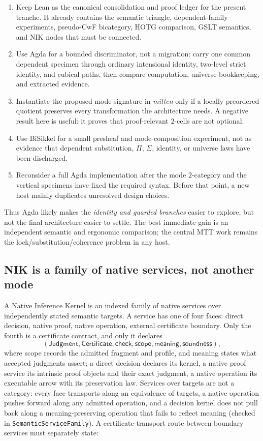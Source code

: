 \documentclass[11pt]{article}
\theoremstyle{definition}
\theoremstyle{remark}
\begin{document}
\begin{enumerate}
\item Keep Lean as the canonical consolidation and proof ledger for the present
  tranche.  It already contains the semantic triangle, dependent-family
  experiments, pseudo-CwF bicategory, HOTG comparison, GSLT semantics, and NIK
  nodes that must be connected.
\item Use Agda for a bounded discriminator, not a migration: carry one common
  dependent specimen through ordinary intensional identity, two-level strict
  identity, and cubical paths, then compare computation, universe bookkeeping,
  and extracted evidence.
\item Instantiate the proposed mode signature in \emph{mitten} only if a
  locally preordered quotient preserves every transformation the architecture
  needs.  A negative result here is useful: it proves that proof-relevant
  $2$-cells are not optional.
\item Use BiSikkel for a small presheaf and mode-composition experiment, not as
  evidence that dependent substitution, $\Pi$, $\Sigma$, identity, or universe
  laws have been discharged.
\item Reconsider a full Agda implementation after the mode $2$-category and the
  vertical specimens have fixed the required syntax.  Before that point, a new
  host mainly duplicates unresolved design choices.
\end{enumerate}

Thus Agda likely makes the \emph{identity and guarded branches} easier to
explore, but not the final architecture easier to settle.  The best immediate
gain is an independent semantic and ergonomic comparison; the central MTT work
remains the lock/substitution/coherence problem in any host.

\subsection{NIK is a family of native services, not another mode}

A Native Inference Kernel is an indexed family of native services over
independently stated semantic targets.  A service has one of four faces:
direct decision, native proof, native operation, external certificate
boundary.  Only the fourth is a certificate contract, and only it declares
\[
  (\mathsf{Judgment},\mathsf{Certificate},\mathsf{check},
   \mathsf{scope},\mathsf{meaning},\mathsf{soundness}),
\]
where scope records the admitted fragment and profile, and meaning states what
accepted judgments assert; a direct decision declares its kernel, a native
proof service its intrinsic proof objects and their exact judgment, a native
operation its executable arrow with its preservation law.  Services over
targets are not a category: every face transports along an equivalence of
targets, a native operation pushes forward along any admitted operation, and
a decision kernel does not pull back along a meaning-preserving operation
that fails to reflect meaning (checked in \texttt{SemanticServiceFamily}).  A
certificate-transport route between boundary services must separately state:
\end{document}
